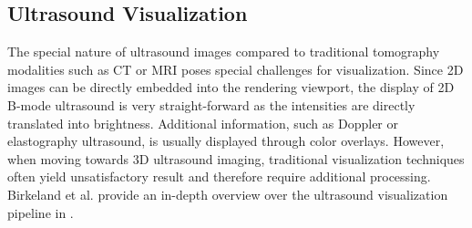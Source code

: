 \subsection{Ultrasound Visualization}
\label{sec:Background:UltrasoundVisualization}
The special nature of ultrasound images compared to traditional tomography modalities such as CT or MRI poses special challenges for visualization.
Since 2D images can be directly embedded into the rendering viewport, the display of 2D B-mode ultrasound is very straight-forward as the intensities are directly translated into brightness.
Additional information, such as Doppler or elastography ultrasound, is usually displayed through color overlays.
However, when moving towards 3D ultrasound imaging, traditional visualization techniques often yield unsatisfactory result and therefore require additional processing.
Birkeland et al. provide an in-depth overview over the ultrasound visualization pipeline in \cite{Birkeland:2012:UsVisPipeline}.

